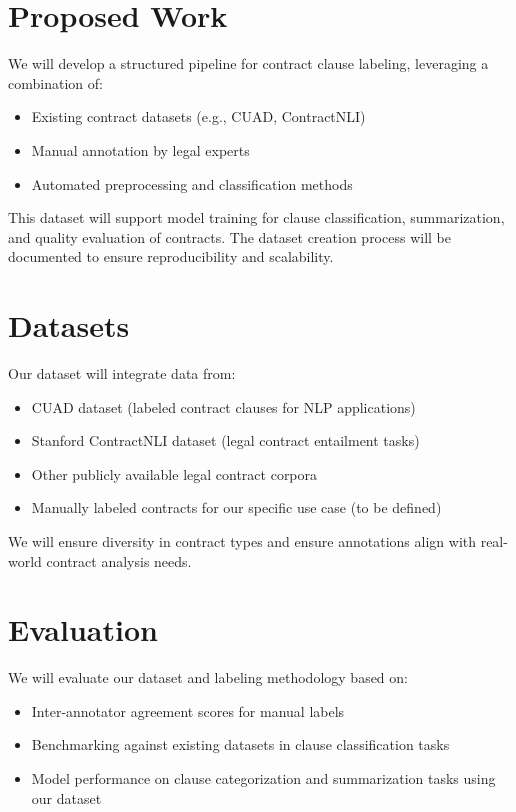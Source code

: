\documentclass[11pt, oneside]{article}   	%
\begin{document}
\section*{Proposed Work}
We will develop a structured pipeline for contract clause labeling, leveraging a combination of:

\begin{itemize}
	\item Existing contract datasets (e.g., CUAD, ContractNLI)
	\item Manual annotation by legal experts
	\item Automated preprocessing and classification methods
\end{itemize}


This dataset will support model training for clause classification, summarization, and quality evaluation of contracts. The dataset creation process will be documented to ensure reproducibility and scalability.

\section*{Datasets}
Our dataset will integrate data from:

\begin{itemize}
	\item CUAD dataset (labeled contract clauses for NLP applications)
	\item Stanford ContractNLI dataset (legal contract entailment tasks)
	\item Other publicly available legal contract corpora
	\item Manually labeled contracts for our specific use case (to be defined)
\end{itemize}

We will ensure diversity in contract types and ensure annotations align with real-world contract analysis needs.

\section*{Evaluation}
We will evaluate our dataset and labeling methodology based on:

\begin{itemize}
	\item Inter-annotator agreement scores for manual labels
	\item Benchmarking against existing datasets in clause classification tasks
	\item Model performance on clause categorization and summarization tasks using our dataset
\end{itemize}
\end{document}
